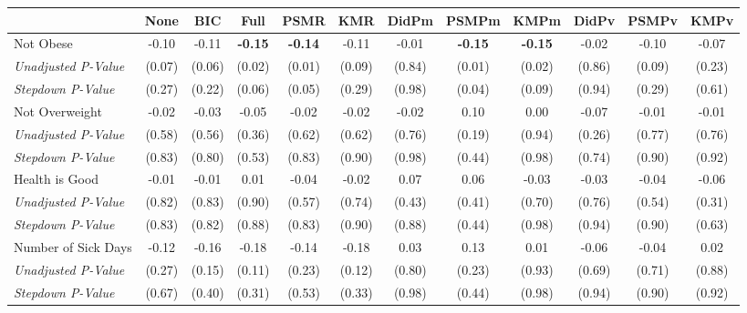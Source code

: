 \begin{tabular}{l c c c c c c c c c c c}
\toprule
 & None & BIC & Full & PSMR & KMR & DidPm & PSMPm & KMPm & DidPv & PSMPv & KMPv \\
\midrule
Not Obese & -0.10 & -0.11 & \textbf{ -0.15 } & \textbf{ -0.14 } & -0.11 & -0.01 & \textbf{ -0.15 } & \textbf{ -0.15 } & -0.02 & -0.10 & -0.07 \\
\quad \textit{Unadjusted P-Value} & (0.07) & (0.06) & (0.02) & (0.01) & (0.09) & (0.84) & (0.01) & (0.02) & (0.86) & (0.09) & (0.23) \\
\quad \textit{Stepdown P-Value} & (0.27) & (0.22) & (0.06) & (0.05) & (0.29) & (0.98) & (0.04) & (0.09) & (0.94) & (0.29) & (0.61) \\
Not Overweight & -0.02 & -0.03 & -0.05 & -0.02 & -0.02 & -0.02 & 0.10 & 0.00 & -0.07 & -0.01 & -0.01 \\
\quad \textit{Unadjusted P-Value} & (0.58) & (0.56) & (0.36) & (0.62) & (0.62) & (0.76) & (0.19) & (0.94) & (0.26) & (0.77) & (0.76) \\
\quad \textit{Stepdown P-Value} & (0.83) & (0.80) & (0.53) & (0.83) & (0.90) & (0.98) & (0.44) & (0.98) & (0.74) & (0.90) & (0.92) \\
Health is Good & -0.01 & -0.01 & 0.01 & -0.04 & -0.02 & 0.07 & 0.06 & -0.03 & -0.03 & -0.04 & -0.06 \\
\quad \textit{Unadjusted P-Value} & (0.82) & (0.83) & (0.90) & (0.57) & (0.74) & (0.43) & (0.41) & (0.70) & (0.76) & (0.54) & (0.31) \\
\quad \textit{Stepdown P-Value} & (0.83) & (0.82) & (0.88) & (0.83) & (0.90) & (0.88) & (0.44) & (0.98) & (0.94) & (0.90) & (0.63) \\
Number of Sick Days & -0.12 & -0.16 & -0.18 & -0.14 & -0.18 & 0.03 & 0.13 & 0.01 & -0.06 & -0.04 & 0.02 \\
\quad \textit{Unadjusted P-Value} & (0.27) & (0.15) & (0.11) & (0.23) & (0.12) & (0.80) & (0.23) & (0.93) & (0.69) & (0.71) & (0.88) \\
\quad \textit{Stepdown P-Value} & (0.67) & (0.40) & (0.31) & (0.53) & (0.33) & (0.98) & (0.44) & (0.98) & (0.94) & (0.90) & (0.92) \\
\bottomrule
\end{tabular}
